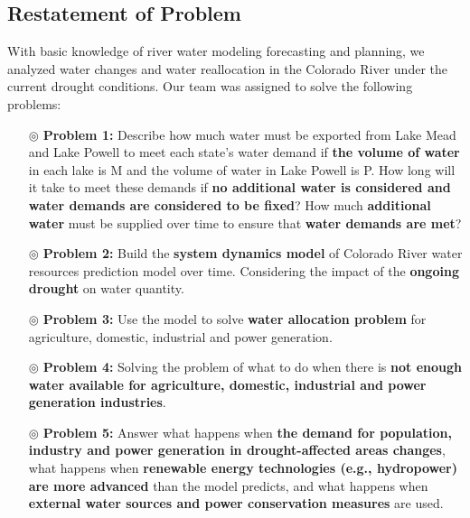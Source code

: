 \subsection{Restatement of Problem}
With basic knowledge of river water modeling forecasting and planning, we analyzed water changes and water reallocation in the Colorado River under the current drought conditions. Our team was assigned to solve the following problems:
\begin{itemize}
  \item[$\circledcirc$] \textbf{Problem 1:} Describe how much water must be exported from Lake Mead and Lake Powell to meet each state's water demand if \textbf{the volume of water} in each lake is M and the volume of water in Lake Powell is P. How long will it take to meet these demands if \textbf{no additional water is considered and water demands are considered to be fixed}? How much \textbf{additional water} must be supplied over time to ensure that \textbf{water demands are met}?
  \item[$\circledcirc$] \textbf{Problem 2:} Build the \textbf{system dynamics model} of Colorado River water resources prediction model over time. Considering the impact of the \textbf{ongoing drought} on water quantity.
  \item[$\circledcirc$] \textbf{Problem 3:} Use the model to solve \textbf{water allocation problem} for agriculture, domestic, industrial and power generation.
  \item[$\circledcirc$] \textbf{Problem 4:} Solving the problem of what to do when there is \textbf{not enough water available for agriculture, domestic, industrial and power generation industries}.
  \item[$\circledcirc$] \textbf{Problem 5:} Answer what happens when \textbf{the demand for population, industry and power generation in drought-affected areas changes}, what happens when \textbf{renewable energy technologies (e.g., hydropower) are more advanced} than the model predicts, and what happens when \textbf{external water sources and power conservation measures} are used.
\end{itemize}